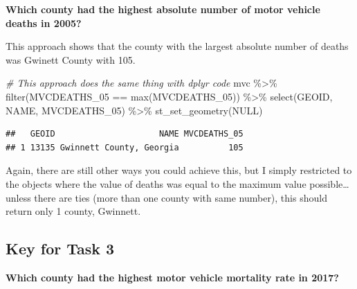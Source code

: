 \documentclass[
]{book}
\newenvironment{Shaded}{\begin{snugshade}}{\end{snugshade}}
\newcommand{\CommentTok}[1]{\textcolor[rgb]{0.56,0.35,0.01}{\textit{#1}}}
\newcommand{\ConstantTok}[1]{\textcolor[rgb]{0.00,0.00,0.00}{#1}}
\newcommand{\FunctionTok}[1]{\textcolor[rgb]{0.00,0.00,0.00}{#1}}
\newcommand{\NormalTok}[1]{#1}
\newcommand{\SpecialCharTok}[1]{\textcolor[rgb]{0.00,0.00,0.00}{#1}}
\begin{document}
\textbf{Which county had the highest absolute number of motor vehicle deaths in 2005?}

\begin{Shaded}
\end{Shaded}

This approach shows that the county with the largest absolute number of deaths was Gwinett County with 105.

\begin{Shaded}
\begin{Highlighting}[]
\CommentTok{\# This approach does the same thing with dplyr code}
\NormalTok{mvc }\SpecialCharTok{\%\textgreater{}\%}
  \FunctionTok{filter}\NormalTok{(MVCDEATHS\_05 }\SpecialCharTok{==} \FunctionTok{max}\NormalTok{(MVCDEATHS\_05)) }\SpecialCharTok{\%\textgreater{}\%}
  \FunctionTok{select}\NormalTok{(GEOID, NAME, MVCDEATHS\_05) }\SpecialCharTok{\%\textgreater{}\%}
  \FunctionTok{st\_set\_geometry}\NormalTok{(}\ConstantTok{NULL}\NormalTok{)}
\end{Highlighting}
\end{Shaded}

\begin{verbatim}
##   GEOID                     NAME MVCDEATHS_05
## 1 13135 Gwinnett County, Georgia          105
\end{verbatim}

Again, there are still other ways you could achieve this, but I simply restricted to the objects where the value of deaths was equal to the maximum value possible\ldots unless there are ties (more than one county with same number), this should return only 1 county, Gwinnett.

\hypertarget{key-for-task-3}{%
\subsection{Key for Task 3}\label{key-for-task-3}}

\textbf{Which county had the highest motor vehicle mortality rate in 2017?}

\begin{Shaded}
\end{Shaded}
\end{document}
